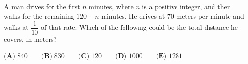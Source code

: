 A man drives for the first $n$ minutes, where $n$ is a positive integer, and then walks for the remaining $120-n$ minutes. He drives at $70$ meters per minute and walks at $\dfrac{1}{10}$ of that rate. Which of the following could be the total distance he covers, in meters?

$\textbf{(A) } 840\qquad\textbf{(B) } 830\qquad\textbf{(C) } 120\qquad\textbf{(D) } 1000\qquad\textbf{(E) } 1281$
